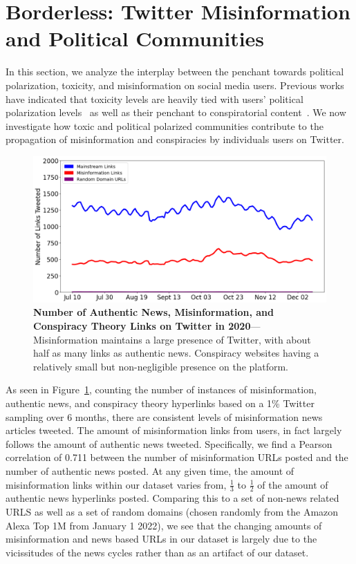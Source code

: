 \section{Borderless: Twitter Misinformation and Political Communities}
In this section, we analyze the interplay between the penchant towards political polarization, toxicity, and misinformation on social media users. Previous works have indicated that toxicity levels are heavily tied with users' political polarization levels~\cite{chipidza2021effect,kim2021distorting} as well as their penchant to conspiratorial content~\cite{hanley2021no}. We now investigate how toxic and political polarized communities contribute to the propagation of misinformation and conspiracies by individuals users on Twitter.  

\begin{figure}
\centering
\includegraphics[width=\columnwidth]{figures/LevelsOfMisinformationAndNewsOnTwitter.png} 
\caption{\textbf{Number of Authentic News, Misinformation, and Conspiracy Theory Links on Twitter in 2020}--- Misinformation maintains a large presence of Twitter, with about half as many links as authentic news. Conspiracy websites having a relatively small but non-negligible presence on the platform. 
}
\label{figure:levels_of_misinfo}
\end{figure}

As seen in Figure~\ref{figure:levels_of_misinfo}, counting the number of instances of misinformation, authentic news, and conspiracy theory hyperlinks based on a 1\% Twitter sampling over 6 months, there are consistent levels of misinformation news articles tweeted. The amount of misinformation links from users, in fact largely follows the amount of authentic news tweeted. Specifically, we find a Pearson correlation of 0.711 between the number of misinformation URLs posted and the number of authentic news posted.  At any given time, the amount of misinformation links within our dataset varies from, $\frac{1}{3}$ to $\frac{1}{2}$ of the amount of authentic news hyperlinks posted. Comparing this to a set of non-news related URLS as well as a set of random domains (chosen randomly from the Amazon Alexa Top 1M from January 1 2022), we see that the changing amounts of misinformation and news based URLs in our dataset is largely due to the vicissitudes of the news cycles rather than as an artifact of our dataset. 

